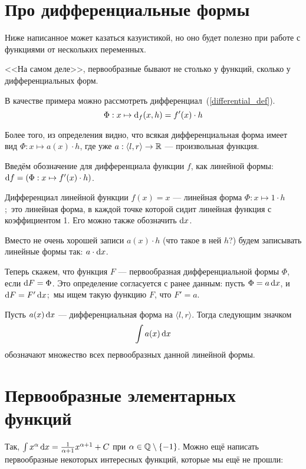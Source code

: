 \documentclass[a4paper]{report}
\begin{document}
    \section{Про дифференциальные формы}

    Ниже написанное может казаться казуистикой, но оно будет полезно при работе с функциями от нескольких переменных.

    <<На самом деле>>, первообразные бывают не столько у функций, сколько у дифференциальных форм.


    В качестве примера можно рассмотреть дифференциал~(\cref{differential_def}). \[\Phi: x \mapsto \operatorname{d}\!_f(x, h) = f'(x) \cdot h\]

    Более того, из определения видно, что всякая дифференциальная форма имеет вид $\Phi: x \mapsto a(x) \cdot h$, где уже $a: \langle l, r \rangle \rightarrow \mathbb{R}$ --- произвольная функция.

    Введём обозначение для дифференциала функции $f$, как линейной формы: $\operatorname{d}\! f = (\Phi: x \mapsto f'(x) \cdot h)$.

    Дифференциал линейной функции $f(x) = x$ --- линейная форма $\Phi: x \mapsto 1 \cdot h$;\ это линейная форма, в каждой точке которой сидит линейная функция с коэффициентом 1.
    Его можно также обозначить $\operatorname{d}\! x$.

    Вместо не очень хорошей записи $a(x) \cdot h$ (что такое в ней $h$?) будем записывать линейные формы так: $a\cdot \operatorname{d}\! x$.

    Теперь скажем, что функция $F$ --- первообразная дифференциальной формы $\Phi$, если $\operatorname{d}\! F = \Phi$.
    Это определение согласуется с ранее данным: пусть $\Phi = a \operatorname{d}\! x$, и $\operatorname{d}\! F = F' \operatorname{d}\! x$;\ мы ищем такую функцию $F$, что $F' = a$.

    Пусть $a(x)\operatorname{d}\! x$ --- дифференциальная форма на $\langle l, r \rangle$.
    Тогда следующим значком\[\int a(x) \operatorname{d}\! x\] обозначают множество всех первообразных данной линейной формы.


    \section{Первообразные элементарных функций}
    Так, $\int x^\alpha \operatorname{d}\! x = \frac{1}{\alpha + 1}x^{\alpha + 1} + C$ при $\alpha \in \mathbb{Q} \setminus \{-1\}$.
    Можно ещё написать первообразные некоторых интересных функций, которые мы ещё не прошли:
\end{document}

